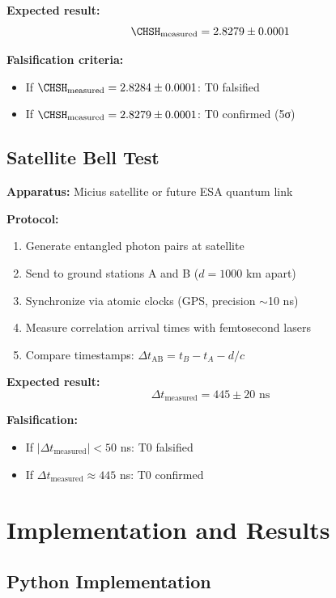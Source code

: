 \textbf{Expected result:}
\begin{equation}
	\CHSH_{\text{measured}} = 2.8279 \pm 0.0001
\end{equation}

\textbf{Falsification criteria:}
\begin{itemize}
	\item If $\CHSH_{\text{measured}} = 2.8284 \pm 0.0001$: T0 falsified
	\item If $\CHSH_{\text{measured}} = 2.8279 \pm 0.0001$: T0 confirmed (5σ)
\end{itemize}

\subsection{Satellite Bell Test}

\textbf{Apparatus:} Micius satellite or future ESA quantum link

\textbf{Protocol:}
\begin{enumerate}
	\item Generate entangled photon pairs at satellite
	\item Send to ground stations A and B ($d = 1000$ km apart)
	\item Synchronize via atomic clocks (GPS, precision $\sim$10 ns)
	\item Measure correlation arrival times with femtosecond lasers
	\item Compare timestamps: $\Delta t_{\text{AB}} = t_B - t_A - d/c$
\end{enumerate}

\textbf{Expected result:}
\begin{equation}
	\Delta t_{\text{measured}} = 445 \pm 20 \text{ ns}
\end{equation}

\textbf{Falsification:}
\begin{itemize}
	\item If $|\Delta t_{\text{measured}}| < 50$ ns: T0 falsified
	\item If $\Delta t_{\text{measured}} \approx 445$ ns: T0 confirmed
\end{itemize}

\section{Implementation and Results}
\label{sec:implementation}

\subsection{Python Implementation}

